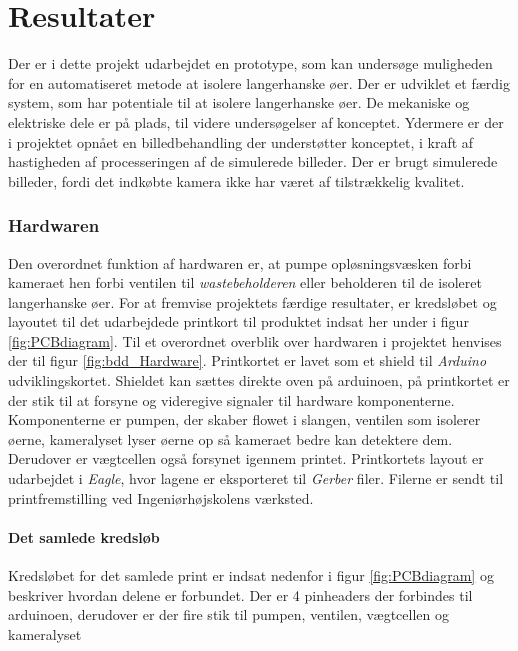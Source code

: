 \chapter{Resultater}

Der er i dette projekt udarbejdet en prototype, som kan undersøge muligheden for en automatiseret metode at isolere langerhanske øer. Der er udviklet et færdig system, som har potentiale til at isolere langerhanske øer. De mekaniske og elektriske dele er på plads, til videre undersøgelser af konceptet. Ydermere er der i projektet opnået en billedbehandling der understøtter konceptet, i kraft af hastigheden af processeringen af de simulerede billeder. Der er brugt simulerede billeder, fordi det indkøbte kamera ikke har været af tilstrækkelig kvalitet.



\subsection{Hardwaren}

Den overordnet funktion af hardwaren er, at pumpe opløsningsvæsken forbi kameraet hen forbi ventilen til \textit{wastebeholderen} eller beholderen til de isoleret langerhanske øer. For at fremvise projektets færdige resultater, er kredsløbet og layoutet til det udarbejdede printkort til produktet indsat her under i figur \ref{fig:PCBdiagram}. Til et overordnet overblik over hardwaren i projektet henvises der til figur \ref{fig:bdd_Hardware}. Printkortet er lavet som et shield til \textit{Arduino} udviklingskortet. Shieldet kan sættes direkte oven på arduinoen, på printkortet er der stik til at forsyne og videregive signaler til hardware komponenterne. Komponenterne er pumpen, der skaber flowet i slangen, ventilen som isolerer øerne, kameralyset lyser øerne op så kameraet bedre kan detektere dem. Derudover er vægtcellen også forsynet igennem printet. Printkortets layout er udarbejdet i \textit{Eagle}, hvor lagene er eksporteret til \textit{Gerber} filer. Filerne er sendt til printfremstilling ved Ingeniørhøjskolens værksted.

\newpage
\subsubsection{Det samlede kredsløb}

Kredsløbet for det samlede print er indsat nedenfor i figur \ref{fig:PCBdiagram} og beskriver hvordan delene er forbundet. Der er 4 pinheaders der forbindes til arduinoen, derudover er der fire stik til pumpen, ventilen, vægtcellen og kameralyset 

